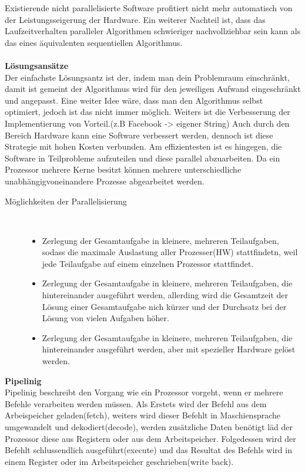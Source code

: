 \documentclass[a4paper,12pt]{article}
\begin{document}
Existierende nicht parallelisierte Software profitiert nicht mehr automatisch von der Leistungsseigerung der Hardware. Ein weiterer Nachteil ist, dass das Laufzeitverhalten paralleler Algorithmen schwieriger nachvollziehbar sein kann als das eines äquivalenten sequentiellen Algorithmus.\\\\
\textbf{Lösungsansätze\\}
Der einfachste Lösungsantz ist der, indem man dein Problemraum einschränkt, damit ist gemeint der Algorithmus wird für den jeweiligen Aufwand eingeschränkt und angepasst. Eine weiter Idee wäre, dass man den Algorithmus selbst optimiert, jedoch ist das nicht immer möglich. Weiters ist die Verbesserung der Implementierung von Vorteil.(z.B Facebook -> eigener String)
Auch durch den Bereich Hardware kann eine Software verbessert werden, dennoch ist diese Strategie mit hohen Kosten verbunden. Am effizientesten ist es hingegen, die Software in Teilprobleme aufzuteilen und diese parallel abzuarbeiten. Da ein Prozessor mehrere Kerne besitzt können mehrere unterschiedliche unabhängigvoneinandere Prozesse abgearbeitet werden. 
\begin{description}
    \item[Möglichkeiten der Parallelisierung] ~\par
    \begin{itemize}
        \item Zerlegung der Gesamtaufgabe in kleinere, mehreren Teilaufgaben, sodass die maximale Auslastung aller Prozesser(HW) stattfindetn, weil jede Teilaufgabe auf einem einzelnen Prozessor stattfindet.
        \item Zerlegung der Gesamtaufgabe in kleinere, mehreren Teilaufgaben, die hintereinander ausgeführt werden, allerding wird die Gesamtzeit der Lösung einer Gesamtaufgabe nich kürzer und der Durchsatz bei der Lösung von vielen Aufgaben höher.
        \item Zerlegung der Gesamtaufgabe in kleinere, mehreren Teilaufgaben, die hintereinander ausgeführt werden, aber mit spezieller Hardware gelöst werden.
    \end{itemize} 
\end{description}
\textbf{Pipelinig\\}
Pipelinig beschreibt den Vorgang wie ein Prozessor vorgeht, wenn er mehrere Befehle verarbeiten werden müssen. Als Erstets wird der Befehl aus dem Arbeispeicher geladen(fetch), weiters wird dieser Befehlt in Maschiensprache umgewandelt und dekodiert(decode), werden zusätzliche Daten benötigt läd der Prozessor diese aus Registern oder aus dem Arbeitspeicher. Folgedessen wird der Befehlt schlussendlich ausgeführt(execute) und das Resultat des Befehls wird in einem Register oder im Arbeitspeicher geschrieben(write back).
\end{document}
